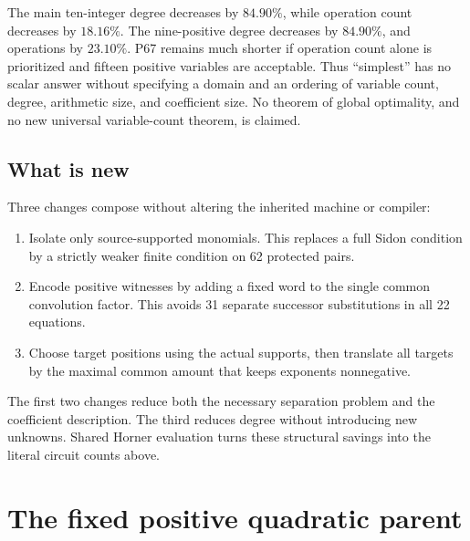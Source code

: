 \documentclass[11pt,letterpaper]{article}
\theoremstyle{definition}\newtheorem{definition}[theorem]{Definition}
\begin{document}
The main ten-integer degree decreases by $84.90\%$, while operation count
decreases by $18.16\%$. The nine-positive degree decreases by $84.90\%$,
and operations by $23.10\%$. P67 remains much shorter if operation count
alone is prioritized and fifteen positive variables are acceptable. Thus
``simplest'' has no scalar answer without specifying a domain and an ordering
of variable count, degree, arithmetic size, and coefficient size. No theorem
of global optimality, and no new universal variable-count theorem, is claimed.

\subsection{What is new}
Three changes compose without altering the inherited machine or compiler:
\begin{enumerate}
\item Isolate only source-supported monomials. This replaces a full Sidon
condition by a strictly weaker finite condition on 62 protected pairs.
\item Encode positive witnesses by adding a fixed word to the single common
convolution factor. This avoids 31 separate successor substitutions in all
22 equations.
\item Choose target positions using the actual supports, then translate all
targets by the maximal common amount that keeps exponents nonnegative.
\end{enumerate}
The first two changes reduce both the necessary separation problem and the
coefficient description. The third reduces degree without introducing new
unknowns. Shared Horner evaluation turns these structural savings into the
literal circuit counts above.

\section{The fixed positive quadratic parent}
\label{sec:parent}
\end{document}
